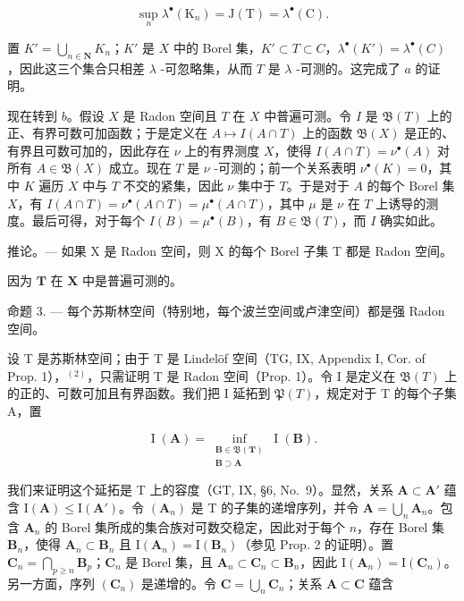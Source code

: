 \[
\sup _ {n} \lambda^ {\bullet} (\mathrm{K} _ {n}) = \mathrm{J} (\mathrm{T}) = \lambda^ {\bullet} (\mathrm{C}).
\]

置 \(K' = \bigcup_{n \in \mathbf{N}} K_n\)；\(K'\) 是 \(X\) 中的 Borel 集，\(K' \subset T \subset C\)，\(\lambda^\bullet(K') = \lambda^\bullet(C)\)，因此这三个集合只相差 \(\lambda\) -可忽略集，从而 \(T\) 是 \(\lambda\) -可测的。这完成了 \(a\) 的证明。

现在转到 \(b\)。假设 \(X\) 是 Radon 空间且 \(T\) 在 \(X\) 中普遍可测。令 \(I\) 是 \(\mathfrak{B}(T)\) 上的正、有界可数可加函数；于是定义在 \(A \mapsto I(A \cap T)\) 上的函数 \(\mathfrak{B}(X)\) 是正的、有界且可数可加的，因此存在 \(\nu\) 上的有界测度 \(X\)，使得 \(I(A \cap T) = \nu^{\bullet}(A)\) 对所有 \(A \in \mathfrak{B}(X)\) 成立。现在 \(T\) 是 \(\nu\) -可测的；前一个关系表明 \(\nu^{\bullet}(K) = 0\)，其中 \(K\) 遍历 \(X\) 中与 \(T\) 不交的紧集，因此 \(\nu\) 集中于 \(T\)。于是对于 \(A\) 的每个 Borel 集 \(X\)，有 \(I(A \cap T) = \nu^{\bullet}(A \cap T) = \mu^{\bullet}(A \cap T)\)，其中 \(\mu\) 是 \(\nu\) 在 \(T\) 上诱导的测度。最后可得，对于每个 \(I(B) = \mu^{\bullet}(B)\)，有 \(B \in \mathfrak{B}(T)\)，而 \(I\) 确实如此。

推论。--- 如果 X 是 Radon 空间，则 X 的每个 Borel 子集 T 都是 Radon 空间。

因为 \(\mathbf{T}\) 在 \(\mathbf{X}\) 中是普遍可测的。

命题 3. --- 每个苏斯林空间（特别地，每个波兰空间或卢津空间）都是强 Radon 空间。

设 T 是苏斯林空间；由于 T 是 Lindelöf 空间（TG, IX, Appendix I, Cor. of Prop. 1），\(^{(2)}\)，只需证明 T 是 Radon 空间（Prop. 1）。令 I 是定义在 \(\mathfrak{B}(T)\) 上的正的、可数可加且有界函数。我们把 I 延拓到 \(\mathfrak{P}(T)\)，规定对于 T 的每个子集 A，置

\[
\operatorname{I}(\mathbf{A}) = \inf_{\substack{\mathbf{B}\in \mathfrak{B}(\mathbf{T})\\ \mathbf{B}\supset \mathbf{A}}}\operatorname{I}(\mathbf{B}).
\]

我们来证明这个延拓是 T 上的容度（GT, IX, §6, No.~9）。显然，关系 \(\mathbf{A} \subset \mathbf{A}'\) 蕴含 \(\mathrm{I}(\mathbf{A}) \leqslant \mathrm{I}(\mathbf{A}')\)。令 \((\mathbf{A}_n)\) 是 T 的子集的递增序列，并令 \(\mathbf{A} = \bigcup_{n} \mathbf{A}_n\)。包含 \(\mathbf{A}_n\) 的 Borel 集所成的集合族对可数交稳定，因此对于每个 \(n\)，存在 Borel 集 \(\mathbf{B}_n\)，使得 \(\mathbf{A}_n \subset \mathbf{B}_n\) 且 \(\mathrm{I}(\mathbf{A}_n) = \mathrm{I}(\mathbf{B}_n)\)（参见 Prop. 2 的证明）。置 \(\mathbf{C}_n = \bigcap_{p \geqslant n} \mathbf{B}_p\)；\(\mathbf{C}_n\) 是 Borel 集，且 \(\mathbf{A}_n \subset \mathbf{C}_n \subset \mathbf{B}_n\)，因此 \(\mathrm{I}(\mathbf{A}_n) = \mathrm{I}(\mathbf{C}_n)\)。另一方面，序列 \((\mathbf{C}_n)\) 是递增的。令 \(\mathbf{C} = \bigcup_{n} \mathbf{C}_n\)；关系 \(\mathbf{A} \subset \mathbf{C}\) 蕴含

